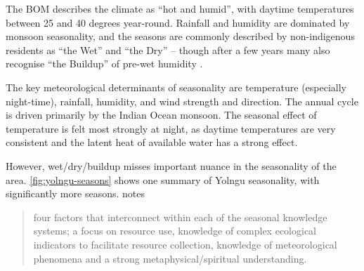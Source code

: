 The BOM describes the 
climate as ``hot and humid'', with daytime temperatures between 25 and 40 
degrees year-round.  Rainfall and humidity are dominated by monsoon 
seasonality, and the seasons are commonly described by non-indigenous residents 
as “the Wet” and “the Dry” – though after a few years many also recognise “the 
Buildup” of pre-wet humidity \citep{willmett2009}.

The key meteorological determinants of seasonality are temperature (especially 
night-time), rainfall, humidity, and wind strength and direction.  The annual 
cycle is driven primarily by the Indian Ocean monsoon.  The seasonal effect of 
temperature is felt most strongly at night, as daytime temperatures are very 
consistent and the latent heat of available water has a strong effect.

However, wet/dry/buildup misses important nuance in the seasonality of the 
area.  \autoref{fig:yolngu-seasons} shows one summary of Yolngu seasonality,
with significantly more seasons.  \citet{woodward2012b} notes
\blockquote{
    four factors that interconnect within each of the seasonal
    knowledge systems; a focus on resource use, knowledge of complex
    ecological indicators to facilitate resource collection,
    knowledge of meteorological phenomena and a strong
    metaphysical/spiritual understanding.
}

